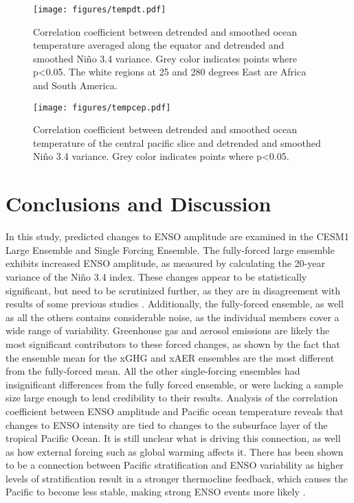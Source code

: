 \documentclass[draft]{agujournal2019}
\begin{document}
\begin{figure}
    \texttt{[image: figures/tempdt.pdf]}
    \caption{Correlation coefficient between detrended and smoothed ocean temperature averaged along the equator and detrended and smoothed Ni\~{n}o 3.4 variance. Grey color indicates points where p<0.05. The white regions at 25 and 280 degrees East are Africa and South America.}
    \label{fig:tempdt_1}
\end{figure}


\begin{figure}
    \texttt{[image: figures/tempcep.pdf]}
    \caption{Correlation coefficient between detrended and smoothed ocean temperature of the central pacific slice and detrended and smoothed Ni\~{n}o 3.4 variance. Grey color indicates points where p<0.05.}
    \label{fig:tempcep_1}
\end{figure}


\section{Conclusions and Discussion}

In this study, predicted changes to ENSO amplitude are examined in the CESM1 Large Ensemble and Single Forcing Ensemble. The fully-forced large ensemble exhibits increased ENSO amplitude, as measured by calculating the 20-year variance of the Ni\~{n}o 3.4 index. These changes appear to be statistically significant, but need to be scrutinized further, as they are in disagreement with results of some previous studies \cite{stevenson2012significant}. Additionally, the fully-forced ensemble, as well as all the others contains considerable noise, as the individual members cover a wide range of variability. Greenhouse gas and aerosol emissions are likely the most significant contributors to these forced changes, as shown by the fact that the ensemble mean for the xGHG and xAER ensembles are the most different from the fully-forced mean. All the other single-forcing ensembles had insignificant differences from the fully forced ensemble, or were lacking a sample size large enough to lend credibility to their results. Analysis of the correlation coefficient between ENSO amplitude and Pacific ocean temperature reveals that changes to ENSO intensity are tied to changes to the subsurface layer of the tropical Pacific Ocean. It is still unclear what is driving this connection, as well as how external forcing such as global warming affects it. There has been shown to be a connection between Pacific stratification and ENSO variability as higher levels of stratification result in a stronger thermocline feedback, which causes the Pacific to become less stable, making strong ENSO events more likely \cite{dewitte2013reinterpreting}.
\end{document}
